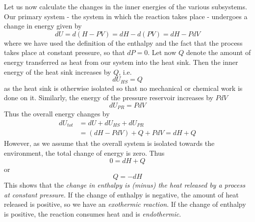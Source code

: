 \documentclass[a4paper, draft]{report}
\numberwithin{section}{chapter}
\numberwithin{equation}{chapter}
\theoremstyle{own}
\theoremstyle{remark}
\begin{document}
Let us now calculate the changes in the inner energies of the various subsystems. Our primary system - the system in which the reaction takes place - undergoes a change in energy given by
$$
dU = d(H - PV) =  dH - d(PV) = dH - P dV
$$
where we have used the definition of the enthalpy and the fact that the process takes place at constant pressure, so that $dP = 0$. Let now $Q$ denote the amount of energy transferred as heat from our system into the heat sink. Then the inner energy of the heat sink increases by $Q$, i.e.
$$
dU_{HS} = Q
$$
as the heat sink is otherwise isolated so that no mechanical or chemical work is done on it. Similarly, the energy of the pressure reservoir increases by $P dV$
$$
dU_{PR} = P dV
$$
Thus the overall energy changes by
\begin{align*}
dU_{tot} &= dU + dU_{HS} + dU_{PR} \\
&= (dH - P dV) + Q + P dV = dH + Q
\end{align*}
However, as we assume that the overall system is isolated towards the environment, the total change of energy is zero. Thus
$$
0 = dH + Q
$$
or
$$
Q = - dH
$$ 
This shows that the {\em change in enthalpy is (minus) the heat released by a process at constant pressure}. If the change of enthalpy is negative, the amount of heat released is positive, so we have an {\em exothermic reaction}. If the change of enthalpy is positive, the reaction consumes heat and is {\em endothermic}.
\end{document}
